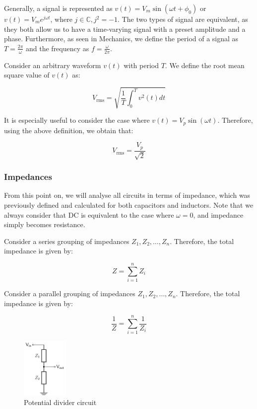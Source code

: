 \documentclass{article}
\begin{document}
Generally, a signal is represented as $v(t) = V_m\sin{\left(\omega t + \phi_0\right)}$ or $v(t) = V_me^{j\omega t}$, where $j \in \mathbb{C}, j^2 = -1$. The two types of signal are equivalent, as they both allow us to have a time-varying signal with a preset amplitude and a phase. Furthermore, as seen in Mechanics, we define the period of a signal as $T = \frac{2\pi}{\omega}$ and the frequency as $f = \frac{\omega}{2\pi}$.

\begin{definition}
    Consider an arbitrary waveform $v(t)$ with period $T$. We define the root mean square value of $v(t)$ as:

    \[ V_{\text{rms}} = \sqrt{\frac{1}{T}\int_0^T v^2(t)dt} \]
\end{definition}

It is especially useful to consider the case where $v(t) = V_p\sin{\left(\omega t\right)}$. Therefore, using the above definition, we obtain that:

\[ V_{\text{rms}} = \frac{V_p}{\sqrt{2}} \]

\subsubsection{Impedances}

From this point on, we will analyse all circuits in terms of impedance, which was previously defined and calculated for both capacitors and inductors. Note that we always consider that DC is equivalent to the case where $\omega = 0$, and impedance simply becomes resistance.

\begin{proposition}
    Consider a series grouping of impedances $Z_1, Z_2, \dots, Z_n$. Therefore, the total impedance is given by:

    \[ Z = \sum_{i = 1}^n Z_i \]
\end{proposition}

\begin{proposition}
    Consider a parallel grouping of impedances $Z_1, Z_2, \dots, Z_n$. Therefore, the total impedance is given by:

    \[ \frac{1}{Z} = \sum_{i = 1}^n \frac{1}{Z_i} \]
\end{proposition}

\begin{figure}[h]
    \centering
    \includegraphics[width=0.2\textwidth]{images/potential divider.png}
    \caption{Potential divider circuit}
    \label{fig:potential-divider-circuit}
\end{figure}
\end{document}
